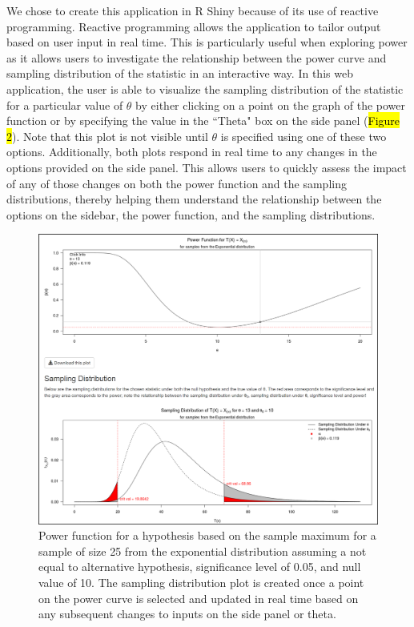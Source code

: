 \documentclass{TISE}
\begin{document}
We chose to create this application in {\sf R} Shiny because of its use of reactive programming. Reactive programming allows the application to tailor output based on user input in real time. This is particularly useful when exploring power as it allows users to investigate the relationship between the power curve and sampling distribution of the statistic in an interactive way. In this web application, the user is able to visualize the sampling distribution of the statistic for a particular value of $\theta$ by either clicking on a point on the graph of the power function or by specifying the value in the ``Theta" box on the side panel (\hl{Figure 2}). Note that this plot is not visible until $\theta$ is specified using one of these two options. Additionally, both plots respond in real time to any changes in the options provided on the side panel. This allows users to quickly assess the impact of any of those changes on both the power function and the sampling distributions, thereby helping them understand the relationship between the options on the sidebar, the power function, and the sampling distributions. 

\begin{figure}[H]
	\centering
	\includegraphics[scale=1]{reactive2.png}
	\caption{Power function for a hypothesis based on the sample maximum for a sample of size 25 from the exponential distribution assuming a not equal to alternative hypothesis, significance level of 0.05, and null value of 10. The sampling distribution plot is created once a point on the power curve is selected and updated in real time based on any subsequent changes to inputs on the side panel or theta.}
\end{figure}
\end{document}
